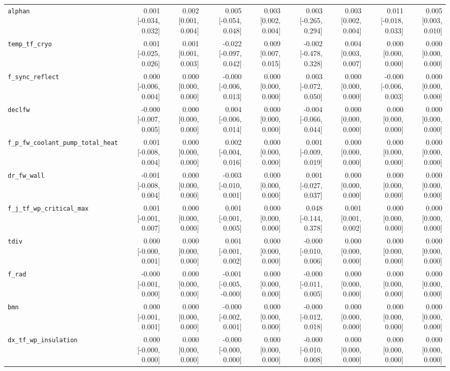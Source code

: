 \begin{tabular}{lrrrrrrrr}
\texttt{alphan} & 0.001 [-0.034, 0.032] & 0.002 [0.001, 0.004] & 0.005 [-0.054, 0.048] & 0.003 [0.002, 0.004] & 0.003 [-0.265, 0.294] & 0.003 [0.002, 0.004] & 0.011 [-0.018, 0.033] & 0.005 [0.003, 0.010] \\
\texttt{temp\_tf\_cryo} & 0.001 [-0.025, 0.026] & 0.001 [0.001, 0.003] & -0.022 [-0.097, 0.042] & 0.009 [0.007, 0.015] & -0.002 [-0.478, 0.328] & 0.004 [0.003, 0.007] & 0.000 [0.000, 0.000] & 0.000 [0.000, 0.000] \\
\texttt{f\_sync\_reflect} & 0.000 [-0.006, 0.004] & 0.000 [0.000, 0.000] & -0.000 [-0.006, 0.013] & 0.000 [0.000, 0.000] & 0.003 [-0.072, 0.050] & 0.000 [0.000, 0.000] & -0.000 [-0.006, 0.003] & 0.000 [0.000, 0.000] \\
\texttt{declfw} & -0.000 [-0.007, 0.005] & 0.000 [0.000, 0.000] & 0.004 [-0.006, 0.014] & 0.000 [0.000, 0.000] & -0.004 [-0.066, 0.044] & 0.000 [0.000, 0.000] & 0.000 [0.000, 0.000] & 0.000 [0.000, 0.000] \\
\texttt{f\_p\_fw\_coolant\_pump\_total\_heat} & 0.001 [-0.008, 0.004] & 0.000 [0.000, 0.000] & 0.002 [-0.004, 0.016] & 0.000 [0.000, 0.000] & 0.001 [-0.009, 0.019] & 0.000 [0.000, 0.000] & 0.000 [0.000, 0.000] & 0.000 [0.000, 0.000] \\
\texttt{dr\_fw\_wall} & -0.001 [-0.008, 0.004] & 0.000 [0.000, 0.000] & -0.003 [-0.010, 0.001] & 0.000 [0.000, 0.000] & 0.001 [-0.027, 0.037] & 0.000 [0.000, 0.000] & 0.000 [0.000, 0.000] & 0.000 [0.000, 0.000] \\
\texttt{f\_j\_tf\_wp\_critical\_max} & 0.001 [-0.001, 0.007] & 0.000 [0.000, 0.000] & 0.001 [-0.001, 0.005] & 0.000 [0.000, 0.000] & 0.048 [-0.144, 0.378] & 0.001 [0.001, 0.002] & 0.000 [0.000, 0.000] & 0.000 [0.000, 0.000] \\
\texttt{tdiv} & 0.000 [-0.000, 0.001] & 0.000 [0.000, 0.000] & 0.001 [-0.001, 0.002] & 0.000 [0.000, 0.000] & -0.000 [-0.010, 0.006] & 0.000 [0.000, 0.000] & 0.000 [0.000, 0.000] & 0.000 [0.000, 0.000] \\
\texttt{f\_rad} & -0.000 [-0.001, 0.000] & 0.000 [0.000, 0.000] & -0.001 [-0.005, -0.000] & 0.000 [0.000, 0.000] & -0.000 [-0.011, 0.005] & 0.000 [0.000, 0.000] & 0.000 [0.000, 0.000] & 0.000 [0.000, 0.000] \\
\texttt{bmn} & 0.000 [-0.001, 0.001] & 0.000 [0.000, 0.000] & -0.000 [-0.002, 0.001] & 0.000 [0.000, 0.000] & -0.000 [-0.012, 0.018] & 0.000 [0.000, 0.000] & 0.000 [0.000, 0.000] & 0.000 [0.000, 0.000] \\
\texttt{dx\_tf\_wp\_insulation} & 0.000 [-0.000, 0.000] & 0.000 [0.000, 0.000] & -0.000 [-0.000, 0.000] & 0.000 [0.000, 0.000] & -0.000 [-0.010, 0.008] & 0.000 [0.000, 0.000] & 0.000 [0.000, 0.000] & 0.000 [0.000, 0.000] \\

\end{tabular}
